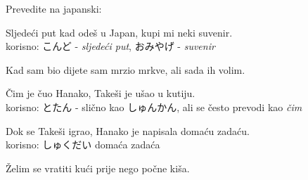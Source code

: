 	\begin{mondai}{Prevedite na japanski:}
		\item Sljedeći put kad odeš u Japan, kupi mi neki suvenir.\\korisno: こんど - \textit{sljedeći put}, おみやげ - \textit{suvenir}
		\item Kad sam bio dijete sam mrzio mrkve, ali sada ih volim.
		\item Čim je čuo Hanako, Takeši je ušao u kutiju.\\korisno: とたん - slično kao しゅんかん, ali se često prevodi kao \textit{čim}
		\item Dok se Takeši igrao, Hanako je napisala domaću zadaću.\\korisno: しゅくだい domaća zadaća
		\item Želim se vratiti kući prije nego počne kiša.
	\end{mondai}

